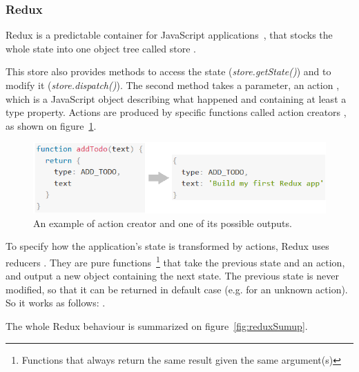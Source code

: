 \subsubsection{Redux}
\label{sssec:redux}

Redux is a predictable container for JavaScript applications~\cite{reduxDoc}, that stocks the whole state into one object tree called \guillemotleft{} store \guillemotright{}. 

This store also provides methods to access the state (\textit{store.getState()}) and to modify it (\textit{store.dispatch()}). The second method takes a parameter, an \guillemotleft{} action \guillemotright{}, which is a JavaScript object describing what happened and containing at least a type property. Actions are produced by specific functions called \guillemotleft{} action 
creators \guillemotright{}, as shown on {\sc figure}~\ref{fig:action}.

\begin{figure}[H]
    \centering
    \includegraphics[scale=0.9]{figure/action.png}
    \caption{An example of action creator and one of its possible outputs.}
    \label{fig:action}
\end{figure}

To specify how the application's state is transformed by actions, Redux uses \guillemotleft{} reducers \guillemotright{}. They are pure functions~\footnote{Functions that always return the same result given the same argument(s)} that take the previous state and an action, and output a new object containing the next state. The previous state is never modified, so that it can be returned in default case (e.g. for an unknown action). So it works as follows: .

The whole Redux behaviour is summarized on {\sc figure}~\ref{fig:reduxSumup}.

